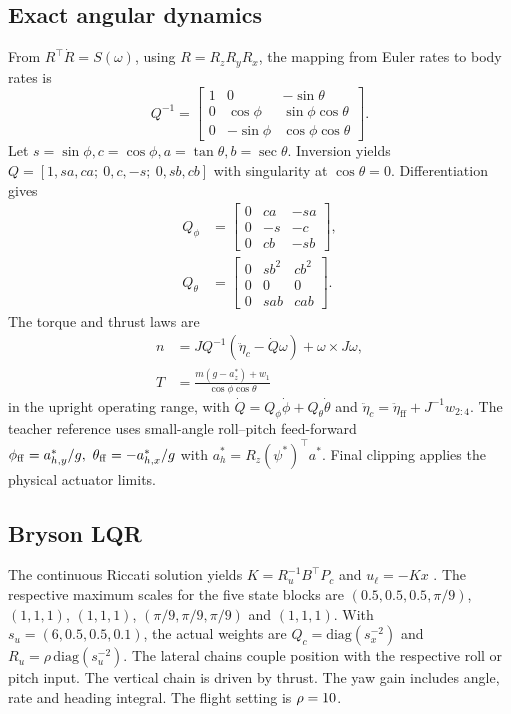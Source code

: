 \documentclass[conference]{IEEEtran}
\begin{document}
\subsection{Exact angular dynamics}
From \(R^\top\dot R=S(\omega)\), using \(R=R_zR_yR_x\),
the mapping from Euler rates to body rates is
\begin{equation}
Q^{-1}=\begin{bmatrix}
1&0&-\sin\theta\\
0&\cos\phi&\sin\phi\cos\theta\\
0&-\sin\phi&\cos\phi\cos\theta
\end{bmatrix}.
\end{equation}
Let \(s=\sin\phi,c=\cos\phi,a=\tan\theta,b=\sec\theta\).
Inversion yields \(Q=[1,sa,ca;\ 0,c,-s;\ 0,sb,cb]\)
with singularity at \(\cos\theta=0\). Differentiation gives
\begin{align}
Q_\phi&=\begin{bmatrix}0&ca&-sa\\0&-s&-c\\0&cb&-sb\end{bmatrix},\\
Q_\theta&=\begin{bmatrix}0&sb^2&cb^2\\0&0&0\\0&sab&cab\end{bmatrix}.
\end{align}
The torque and thrust laws are
\begin{align}
n&=JQ^{-1}(\ddot\eta_c-\dot Q\omega)+\omega\times J\omega,\\
T&=\frac{m(g-a_z^\ast)+w_1}{\cos\phi\cos\theta}
\end{align}
in the upright operating range, with
\(\dot Q=Q_\phi\dot\phi+Q_\theta\dot\theta\) and
\(\ddot\eta_c=\ddot\eta_{\mathrm{ff}}+J^{-1}w_{2:4}\).
The teacher reference uses small-angle roll--pitch feed-forward
\(\phi_{\rm ff}=a^\ast_{h,y}/g,\ \theta_{\rm ff}=-a^\ast_{h,x}/g\)
with \(a^\ast_h=R_z(\psi^\ast)^\top a^\ast\).
Final clipping applies the physical actuator limits.

\subsection{Bryson LQR}
The continuous Riccati solution yields
\(K=R_u^{-1}B^\top P_c\) and \(u_\ell=-Kx\) \cite{anderson}.
The respective maximum scales for the five state blocks are
\((0.5,0.5,0.5,\pi/9)\), \((1,1,1)\), \((1,1,1)\),
\((\pi/9,\pi/9,\pi/9)\) and \((1,1,1)\).
With \(s_u=(6,0.5,0.5,0.1)\), the actual weights are
\(Q_c=\mathrm{diag}(s_x^{-2})\) and
\(R_u=\rho\,\mathrm{diag}(s_u^{-2})\).
The lateral chains couple position with the respective roll
or pitch input. The vertical chain is driven by thrust.
The yaw gain includes angle, rate and heading integral.
The flight setting is \(\rho=10\).
\end{document}
